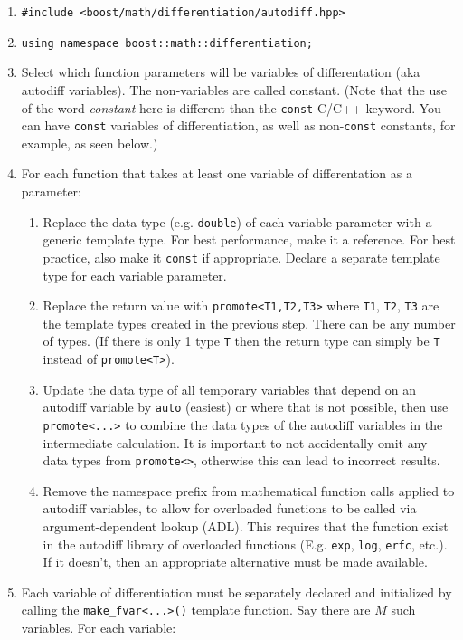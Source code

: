 \documentclass{article}
\begin{document}
\begin{enumerate}
\item {\tt \#include <boost/math/differentiation/autodiff.hpp>}
\item {\tt using namespace boost::math::differentiation;}
\item Select which function parameters will be variables of differentation (aka autodiff variables). The
  non-variables are called constant. (Note that the use of the word {\it constant}\/ here is different than the
  {\tt const} C/C++ keyword. You can have {\tt const} variables of differentiation, as well as non-{\tt const}
  constants, for example, as seen below.)
\item For each function that takes at least one variable of differentation as a parameter:
  \begin{enumerate}
  \item Replace the data type (e.g. {\tt double}) of each variable parameter with a generic template type.
    For best performance, make it a reference. For best practice, also make it {\tt const} if appropriate.
    Declare a separate template type for each variable parameter.
  \item Replace the return value with {\tt promote<T1,T2,T3>} where {\tt T1}, {\tt T2}, {\tt T3} are the template
    types created in the previous step. There can be any number of types. (If there is only 1 type {\tt T} then the
    return type can simply be {\tt T} instead of {\tt promote<T>}).
  \item Update the data type of all temporary variables that depend on an autodiff variable by {\tt auto} (easiest)
    or where that is not possible, then use {\tt promote<...>} to combine the data types of the autodiff variables
    in the intermediate calculation. It is important to not accidentally omit any data types from {\tt promote<>},
    otherwise this can lead to incorrect results.
  \item Remove the namespace prefix from mathematical function calls applied to autodiff variables, to allow
    for overloaded functions to be called via argument-dependent lookup (ADL). This requires that the function exist
    in the autodiff library of overloaded functions (E.g. {\tt exp}, {\tt log}, {\tt erfc}, etc.). If it doesn't,
    then an appropriate alternative must be made available.
  \end{enumerate}
\item Each variable of differentiation must be separately declared and initialized by calling the
  {\tt make\_fvar<...>()} template function. Say there are $M$ such variables. For each variable:

\end{enumerate}
\end{document}
